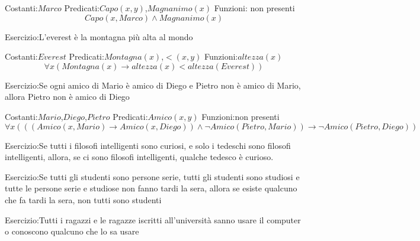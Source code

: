 Costanti:$Marco$ \newline
Predicati:$Capo(x,y)$,$Magnanimo(x)$ \newline
Funzioni: non presenti \newline
\begin{equation*}
    Capo(x,Marco) \land Magnanimo(x)
\end{equation*}

Esercizio:L'everest è la montagna più alta al mondo

Costanti:$Everest$ \newline
Predicati:$Montagna(x)$,$<(x,y)$ \newline
Funzioni:$altezza(x)$
\begin{equation*}
    \forall x (Montagna(x) \rightarrow altezza(x) < altezza(Everest))
\end{equation*}

Esercizio:Se ogni amico di Mario è amico di Diego e Pietro non è amico di
          Mario, allora Pietro non è amico di Diego

Costanti:$Mario$,$Diego$,$Pietro$ \newline
Predicati:$Amico(x,y)$ \newline
Funzioni:non presenti
\begin{equation*}
    \forall x (((Amico(x,Mario) \rightarrow Amico(x,Diego)) \land \neg Amico(Pietro,Mario))
                \rightarrow \neg Amico(Pietro,Diego))
\end{equation*}

Esercizio:Se tutti i filosofi intelligenti sono curiosi, e solo i tedeschi sono
filosofi intelligenti, allora, se ci sono filosofi intelligenti, qualche
tedesco è curioso.

Esercizio:Se tutti gli studenti sono persone serie, tutti gli studenti sono
studiosi e tutte le persone serie e studiose non fanno tardi la
sera, allora se esiste qualcuno che fa tardi la sera, non tutti sono
studenti

Esercizio:Tutti i ragazzi e le ragazze iscritti all’università sanno usare il
          computer o conoscono qualcuno che lo sa usare
